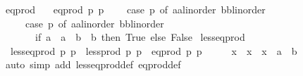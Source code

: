 \begin{isabellebody}
\isanewline
{}\isamarkupfalse%
\ eq{\isacharunderscore}{\kern0pt}prod\ \isanewline
\ \ {\isachardoublequoteopen}eq{\isacharunderscore}{\kern0pt}prod\ p{}\ p{}\ {\isasymequiv}\isanewline
\ \ \ case\ p{}\ of\ {\isacharparenleft}{\kern0pt}a{}{\isacharcolon}{\kern0pt}{\isacharcolon}{\kern0pt}{\isacharprime}{\kern0pt}a{\isacharcolon}{\kern0pt}{\isacharcolon}{\kern0pt}linorder{\isacharcomma}{\kern0pt}\ b{}{\isacharcolon}{\kern0pt}{\isacharcolon}{\kern0pt}{\isacharprime}{\kern0pt}b{\isacharcolon}{\kern0pt}{\isacharcolon}{\kern0pt}linorder{\isacharparenright}{\kern0pt}\ {\isasymRightarrow}\isanewline
\ \ \ \ \ case\ p{}\ of\ {\isacharparenleft}{\kern0pt}a{}{\isacharcolon}{\kern0pt}{\isacharcolon}{\kern0pt}{\isacharprime}{\kern0pt}a{\isacharcolon}{\kern0pt}{\isacharcolon}{\kern0pt}linorder{\isacharcomma}{\kern0pt}\ b{}{\isacharcolon}{\kern0pt}{\isacharcolon}{\kern0pt}{\isacharprime}{\kern0pt}b{\isacharcolon}{\kern0pt}{\isacharcolon}{\kern0pt}linorder{\isacharparenright}{\kern0pt}\ {\isasymRightarrow}\isanewline
\ \ \ \ \ \ \ if\ {\isacharparenleft}{\kern0pt}a{}\ {\isacharequal}{\kern0pt}\ a{}{\isacharparenright}{\kern0pt}\ {\isasymand}\ {\isacharparenleft}{\kern0pt}b{}\ {\isacharequal}{\kern0pt}\ b{}{\isacharparenright}{\kern0pt}\ then\ True\ else\ False{\isachardoublequoteclose}\isanewline
\isanewline
{}\isamarkupfalse%
\ less{\isacharunderscore}{\kern0pt}eq{\isacharunderscore}{\kern0pt}prod\ \isanewline
\ \ {\isachardoublequoteopen}less{\isacharunderscore}{\kern0pt}eq{\isacharunderscore}{\kern0pt}prod\ p{}\ p{}\ {\isasymequiv}\ less{\isacharunderscore}{\kern0pt}prod{\isacharprime}{\kern0pt}\ p{}\ p{}\ {\isasymor}\ eq{\isacharunderscore}{\kern0pt}prod\ p{}\ p{}{\isachardoublequoteclose}\isanewline
\isanewline
{}\isamarkupfalse%
%
\isadelimproof
\ %
\endisadelimproof
%
\isatagproof
{}\isamarkupfalse%
\isanewline
\ \ \isamarkupfalse%
\ {\isachardoublequoteopen}x\ {\isasymle}\ x{\isachardoublequoteclose}\ \ x\ {\isacharcolon}{\kern0pt}{\isacharcolon}{\kern0pt}\ {\isachardoublequoteopen}{\isacharprime}{\kern0pt}a\ {\isasymtimes}\ {\isacharprime}{\kern0pt}b{\isachardoublequoteclose}\isanewline
\ \ \ \ \isamarkupfalse%
\ {\isacharparenleft}{\kern0pt}auto\ simp\ add{\isacharcolon}{\kern0pt}\ less{\isacharunderscore}{\kern0pt}eq{\isacharunderscore}{\kern0pt}prod{\isacharunderscore}{\kern0pt}def\ eq{\isacharunderscore}{\kern0pt}prod{\isacharunderscore}{\kern0pt}def{\isacharparenright}{\kern0pt}\isanewline

\end{isabellebody}
